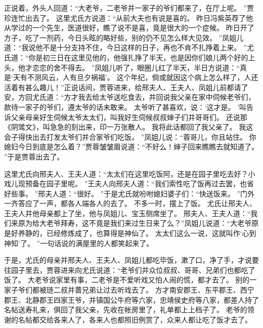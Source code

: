 正说着，外头人回道：“大老爷，二老爷并一家子的爷们都来了，在厅上呢。
”贾珍连忙出去了。
这里尤氏方说道：“从前大夫也有说是喜的。
昨日冯紫英荐了他从学过的一个先生，医道很好，瞧了说不是喜，竟是很大的一个症候。
昨日开了方子，吃了一剂药，今日头眩的略好些，别的仍不见怎么样大见效。
”凤姐儿道：“我说他不是十分支持不住，今日这样的日子，再也不肯不扎挣着上来。
”尤氏道：“你是初三日在这里见他的，他强扎挣了半天，也是因你们娘儿两个好的上头，他才恋恋的舍不得去。
”凤姐儿听了，眼圈儿红了半天，半日方说道：“真是‘天有不测风云，人有旦夕祸福’。
这个年纪，倘或就因这个病上怎么样了，人还活着有甚么趣儿！”正说话间，贾蓉进来，给邢夫人、王夫人、凤姐儿前都请了安，方回尤氏道：“方才我去给太爷送吃食去，并回说我父亲在家中伺候老爷们，款待一家子的爷们，遵太爷的话未敢来。
太爷听了甚喜欢，说：‘这才是。
’叫告诉父亲母亲好生伺候太爷太太们，叫我好生伺候叔叔婶子们并哥哥们。
还说那《阴骘文》，叫急急的刻出来，印一万张散人。
我将此话都回了我父亲了。
我这会子得快出去打发太爷们并合家爷们吃饭。
”凤姐儿说：“蓉哥儿，你且站住。
你媳妇今日到底是怎么着？”贾蓉皱皱眉说道：“不好么！婶子回来瞧瞧去就知道了。
”于是贾蓉出去了。
\par
这里尤氏向邢夫人、王夫人道：“太太们在这里吃饭阿，还是在园子里吃去好？小戏儿现预备在园子里呢。
”王夫人向邢夫人道：“我们索性吃了饭再过去罢，也省好些事。
”邢夫人道：“很好。
”于是尤氏就吩咐媳妇婆子们：“快送饭来。
”门外一齐答应了一声，都各人端各人的去了。
不多一时，摆上了饭。
尤氏让邢夫人、王夫人并他母亲都上了坐，他与凤姐儿、宝玉侧席坐了。
邢夫人、王夫人道：“我们来原为给大老爷拜寿，这不竟是我们来过生日来了么？”凤姐儿说道：“大老爷原是好养静的，已经修炼成了，也算得是神仙了。
太太们这么一说，这就叫作‘心到神知’了。
”一句话说的满屋里的人都笑起来了。
\par
于是，尤氏的母亲并邢夫人、王夫人、凤姐儿都吃毕饭，漱了口，净了手，才说要往园子里去，贾蓉进来向尤氏说道：“老爷们并众位叔叔、哥哥、兄弟们也都吃了饭了。
大老爷说家里有事，二老爷是不爱听戏又怕人闹的慌，都才去了。
别的一家子爷们都被琏二叔并蔷兄弟让过去听戏去了。
方才南安郡王、东平郡王、西宁郡王、北静郡王四家王爷，并镇国公牛府等六家，忠靖侯史府等八家，都差人持了名帖送寿礼来，俱回了我父亲，先收在帐房里了，礼单都上上档子了。
老爷的领谢的名帖都交给各来人了，各来人也都照旧例赏了，众来人都让吃了饭才去了。
